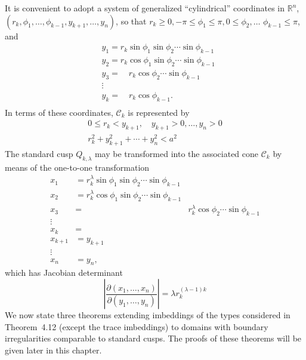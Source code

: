 \begin{para}
  It is convenient to adopt a system of generalized ``cylindrical'' coordinates
  in $\mathbb{R}^n$, $\left(r_k, \phi_1, \ldots, \phi_{k-1}, y_{k+1}, \ldots, y_n\right)$,
  so that $r_k \geq 0,-\pi \leq \phi_1 \leq \pi, 0 \leq \phi_2, \ldots$
  $\phi_{k-1} \leq \pi$, and
  \[
  \begin{aligned}
  & y_1=r_k \sin \phi_1 \sin \phi_2 \cdots \sin \phi_{k-1} \\
  & y_2=r_k \cos \phi_1 \sin \phi_2 \cdots \sin \phi_{k-1} \\
  & y_3=\quad r_k \cos \phi_2 \cdots \sin \phi_{k-1} \\
  & \vdots \\
  & y_k=\quad r_k \cos \phi_{k-1} \text {. } \\
  &
  \end{aligned}
  \]
  In terms of these coordinates, $\mathcal{C}_k$ is represented by
  \[
  \begin{gathered}
  0 \leq r_k<y_{k+1}, \quad y_{k+1}>0, \ldots, y_n>0 \\
  r_k^2+y_{k+1}^2+\cdots+y_n^2<a^2
  \end{gathered}
  \]
  The standard cusp $Q_{k, \lambda}$ may be transformed into the associated cone $\mathcal{C}_k$ by means of the one-to-one transformation
  \[
  \begin{array}{rlr}
  x_1 & =r_k^\lambda \sin \phi_1 \sin \phi_2 \cdots \sin \phi_{k-1} \\
  x_2 & =r_k^\lambda \cos \phi_1 \sin \phi_2 \cdots \sin \phi_{k-1} \\
  x_3 & = & r_k^\lambda \cos \phi_2 \cdots \sin \phi_{k-1} \\
  \vdots & \\
  x_k & = & \\
  x_{k+1} & =y_{k+1} & \\
  \vdots & \\
  x_n & =y_n,
  \end{array}
  \]
  which has Jacobian determinant
  \[
  \left|\frac{\partial\left(x_1, \ldots, x_n\right)}{\partial\left(y_1, \ldots, y_n\right)}\right|=\lambda r_k^{(\lambda-1) k}
  \]
  We now state three theorems extending imbeddings of the types considered in Theorem~4.12 
  (except the trace imbeddings) to domains with boundary irregularities comparable to standard 
  cusps. The proofs of these theorems will be given later in this chapter.
\end{para}


